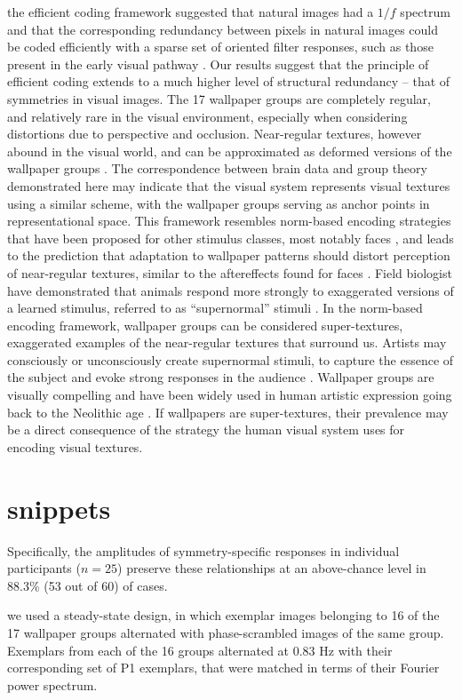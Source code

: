 \documentclass[9pt,twocolumn,twoside,lineno]{pnas-new}
\begin{document}
the efficient coding framework suggested that natural images had a $1/f$ spectrum and that the corresponding redundancy between pixels in natural images could be coded efficiently with a sparse set of oriented filter responses, such as those present in the early visual pathway \cite{RN1740, RN1446}. Our results suggest that the principle of efficient coding extends to a much higher level of structural redundancy – that of symmetries in visual images. The 17 wallpaper groups are completely regular, and relatively rare in the visual environment, especially when considering distortions due to perspective and occlusion. Near-regular textures, however abound in the visual world, and can be approximated as deformed versions of the wallpaper groups \cite{RN1519}. The correspondence between brain data and group theory demonstrated here may indicate that the visual system represents visual textures using a similar scheme, with the wallpaper groups serving as anchor points in representational space. This framework resembles norm-based encoding strategies that have been proposed for other stimulus classes, most notably faces \cite{RN435}, and leads to the prediction that adaptation to wallpaper patterns should distort perception of near-regular textures, similar to the aftereffects found for faces \cite{RN1768}. Field biologist have demonstrated that animals respond more strongly to exaggerated versions of a learned stimulus, referred to as “supernormal” stimuli \cite{RN1775}. In the norm-based encoding framework, wallpaper groups can be considered super-textures, exaggerated examples of the near-regular textures that surround us. Artists may consciously or unconsciously create supernormal stimuli, to capture the essence of the subject and evoke strong responses in the audience \cite{RN1764}. Wallpaper groups are visually compelling and have been widely used in human artistic expression going back to the Neolithic age \cite{RN1949}. If wallpapers are super-textures, their prevalence may be a direct consequence of the strategy the human visual system uses for encoding visual textures. 

\section*{snippets}
Specifically, the amplitudes of symmetry-specific responses in individual participants ($n=25$) preserve these relationships at an above-chance level in 88.3\% (53 out of 60) of cases.

we used a steady-state design, in which exemplar images belonging to 16 of the 17 wallpaper groups alternated with phase-scrambled images of the same group. 
Exemplars from each of the 16 groups alternated at 0.83 Hz with their corresponding set of P1 exemplars, that were matched in terms of their Fourier power spectrum. 
\end{document}
